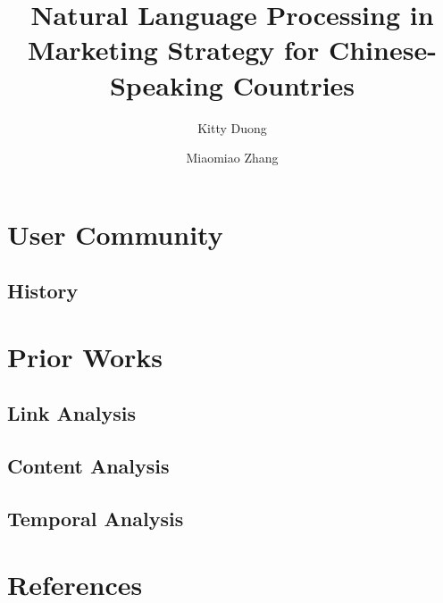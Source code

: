 \documentclass[sigconf]{acmart}
\begin{document}
\title{Natural Language Processing in Marketing Strategy for Chinese-Speaking Countries}
\author{Kitty Duong}

\author{Miaomiao Zhang}

\begin{abstract}

\end{abstract}

\maketitle

\section{User Community}

\subsection{History}

\section{Prior Works}

\subsection{Link Analysis}

\subsection{Content Analysis}

\subsection{Temporal Analysis}

\section{References}
\end{document}
